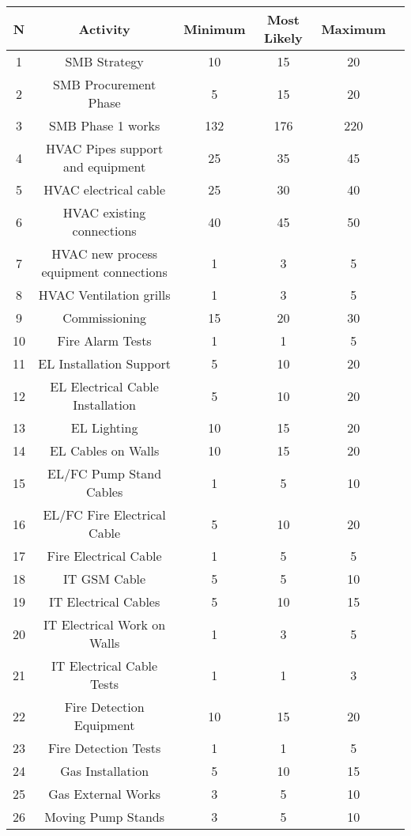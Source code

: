 \begin{table}[ht]
\begin{center}
	\begin{tabular}{ |c|c|c|c|c| c|} 
		\hline
		\hline
		N&Activity & Minimum & Most Likely & Maximum\\
		\hline
		1&SMB Strategy &10 &  15& 20\\ 
		\hline
		2&SMB Procurement Phase &5 &15 &20\\ 
		\hline
		3&SMB Phase 1 works&132 &176 &220\\ 
		\hline
		4&HVAC Pipes support and equipment &25&35&45\\
		\hline
		5&HVAC electrical cable&25&30&40\\
		\hline
		6&HVAC existing connections&40&45&50\\
		\hline
		7&HVAC new process equipment connections&1&3&5\\
		\hline
		8&HVAC Ventilation grills&1&3&5\\
		\hline
		9&Commissioning&15&20&30\\
		\hline
		10&Fire Alarm Tests&1&1&5\\
		\hline
		11&EL Installation Support&5&10&20\\
		\hline
		12&EL Electrical Cable Installation &5&10&20\\
		\hline
		13&EL Lighting&10&15&20\\
		\hline
		14&EL Cables on Walls&10&15&20\\
		\hline
		15&EL/FC Pump Stand Cables&1&5&10\\
		\hline
		16&EL/FC Fire Electrical Cable&5&10&20\\
		\hline
		17&Fire Electrical Cable&1&5&5\\
		\hline
		18&IT GSM Cable&5&5&10\\
		\hline
		19&IT Electrical Cables&5&10&15\\
		\hline
		20&IT Electrical Work on Walls&1&3&5\\
		\hline
		21&IT Electrical Cable Tests &1&1&3\\
		\hline
		22&Fire Detection Equipment&10&15&20\\
		\hline
		23&Fire Detection Tests&1&1&5\\
		\hline
		24&Gas Installation&5&10&15\\
		\hline
		25&Gas External Works&3&5&10\\
		\hline
		26&Moving Pump Stands&3&5&10\\

\end{tabular}
\end{center}
\end{table}
